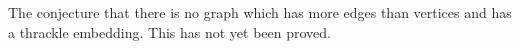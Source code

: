 The conjecture that there is no graph which has more edges 
than vertices and has a thrackle embedding. This has not yet
been proved.